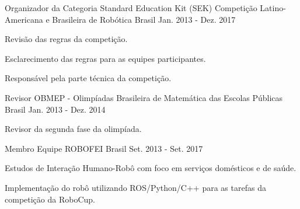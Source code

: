 

\begin{cventries}

  \cventry
    {Organizador da Categoria Standard Education Kit (SEK)} %
    {Competição Latino-Americana e Brasileira de Robótica} %
    {Brasil} %
    {Jan. 2013 - Dez. 2017} %
    {
      \begin{cvitems} %
        \item {Revisão das regras da competição.}
        \item {Esclarecimento das regras para as equipes participantes.}
        \item {Responsável pela parte técnica da competição.}
      \end{cvitems}
    }

  \cventry
    {Revisor} %
    {OBMEP - Olimpíadas Brasileira de Matemática das Escolas Públicas} %
    {Brasil} %
    {Jan. 2013 - Dez. 2014} %
    {
      \begin{cvitems} %
        \item {Revisor da segunda fase da olimpíada.}
      \end{cvitems}
    }

  \cventry
    {Membro} %
    {Equipe ROBOFEI} %
    {Brasil} %
    {Set. 2013 - Set. 2017} %
    {
      \begin{cvitems} %
        \item {Estudos de Interação Humano-Robô com foco em serviços domésticos e de saúde.}
        \item {Implementação do robô utilizando ROS/Python/C++ para as tarefas da competição \@home da RoboCup.}
      \end{cvitems}
    }

\end{cventries}
